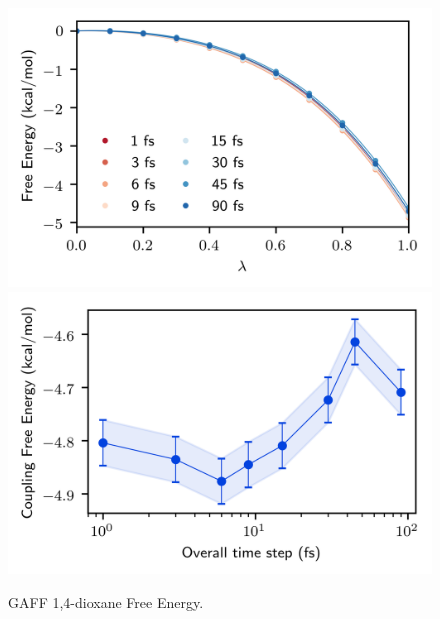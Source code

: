 \documentclass[
aip,
jcp,
reprint,
]{revtex4-1}
\begin{document}
\begin{figure}
	\centering
	\includegraphics{gaff_dioxane_coul_free_energy_profiles}
	\includegraphics{gaff_dioxane_coul_free_energies}
	\caption{GAFF 1,4-dioxane Free Energy.}
	\label{fig:dioxane coulomb free energy}
\end{figure}
\end{document}
